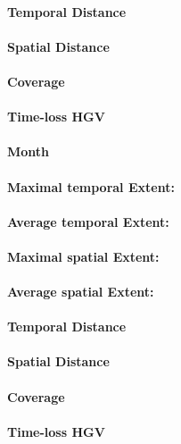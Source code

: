 \paragraph{Temporal Distance}
\paragraph{Spatial Distance}
\paragraph{Coverage}
\paragraph{Time-loss HGV}

\paragraph{Month}

\paragraph{Maximal temporal Extent:}
\paragraph{Average temporal Extent:}
\paragraph{Maximal spatial Extent:}
\paragraph{Average spatial Extent:}
\paragraph{Temporal Distance}
\paragraph{Spatial Distance}
\paragraph{Coverage}
\paragraph{Time-loss HGV}